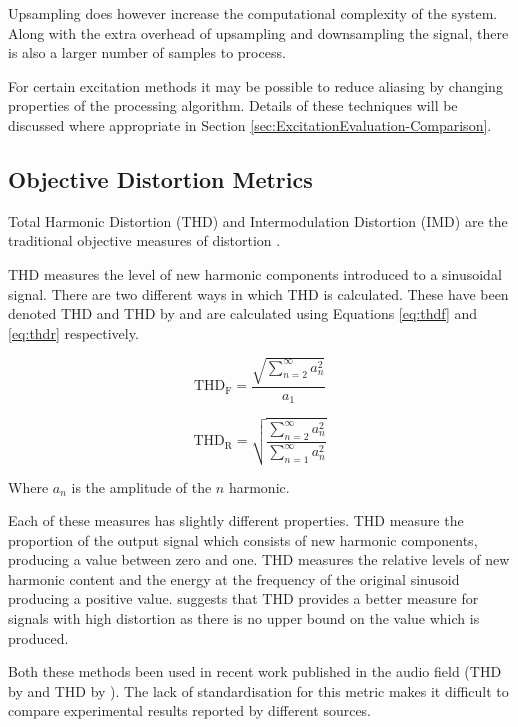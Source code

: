 			Upsampling does however increase the computational complexity of the system. Along with the extra
			overhead of upsampling and downsampling the signal, there is also a larger number of samples to
			process.

			For certain excitation methods it may be possible to reduce aliasing by changing properties of the
			processing algorithm. Details of these techniques will be discussed where appropriate in Section
			\ref{sec:ExcitationEvaluation-Comparison}.

	\subsection{Objective Distortion Metrics}
	\label{sec:Excitation-Analysis-Metrics}
		Total Harmonic Distortion (THD) and Intermodulation Distortion (IMD) are the traditional objective measures
		of distortion \citep{czerwinski2001multitone1}. 
		
		THD measures the level of new harmonic components introduced to a sinusoidal signal. There are two different
		ways in which THD is calculated. These have been denoted THD and THD by
		\citet{shmilovitz2005on} and are calculated using Equations \ref{eq:thdf} and \ref{eq:thdr} respectively.

		\begin{equation}
			\textrm{THD}_{\textrm{F}} = \frac{\sqrt{\sum_{n = 2}^{\infty} a_{n}^{2}}}{a_{1}}
			\label{eq:thdf}
		\end{equation}

		\begin{equation}
			\textrm{THD}_{\textrm{R}} = \sqrt{\frac{\sum_{n = 2}^{\infty} a_{n}^{2}}
			                                       {\sum_{n = 1}^{\infty} a_{n}^{2}}}
			\label{eq:thdr}
		\end{equation}

		Where $a_n$ is the amplitude of the $n$ harmonic. 

		Each of these measures has slightly different properties. THD measure the proportion of the output
		signal which consists of new harmonic components, producing a value between zero and one. THD
		measures the relative levels of new harmonic content and the energy at the frequency of the original
		sinusoid producing a positive value. \citet{shmilovitz2005on} suggests that THD provides a better
		measure for signals with high distortion as there is no upper bound on the value which is produced.

		Both these methods been used in recent work published in the audio field (THD by
		\citet{fleischmann2014a} and THD by \citet{dutilleux2011nonlinear}). The lack of standardisation for
		this metric makes it difficult to compare experimental results reported by different sources.

